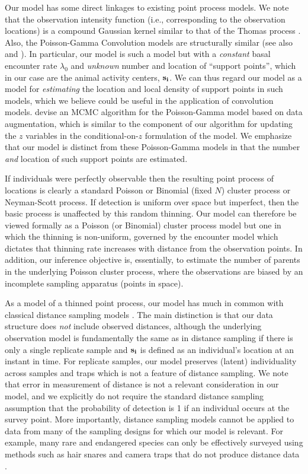 Our model has some direct linkages to existing point process
models. We note that the observation intensity function (i.e.,
corresponding to the observation
locations) is a compound Gaussian kernel similar to
that of the Thomas process
\citep[pp. 61-62]{thomas:1949, moller_waagepetersen:2004}.
Also, the Poisson-Gamma Convolution models
\citep{wolpert_ickstadt:1998} are structurally similar (see also \cite{higdon:1998}
and \cite{best_etal:2000}).
 In particular, our model is such a model but
with a {\it constant} basal encounter rate $\lambda_{0}$
and {\it unknown} number and location of ``support points'', which in
our case are the animal activity centers, $\bf{s_i}$.
We can thus regard our model as a model for
{\it estimating} the location and local density of support points in
such models, which we believe could be useful in the application of
convolution models.  \citet{best_etal:2000} devise an MCMC algorithm for the
Poisson-Gamma model based on data augmentation, which is
similar to the component of our algorithm for
updating the $z$ variables in
the conditional-on-$z$ formulation of the model.  We emphasize that
our model is distinct from these Poisson-Gamma models
in that the number {\it and} location of such
support points are estimated.


If individuals were perfectly observable then the resulting point
process of locations is clearly a standard Poisson or Binomial (fixed
$N$) cluster process or Neyman-Scott process.
If detection is uniform over space but
imperfect, then the basic process is unaffected by this random thinning.
Our model can therefore be viewed formally as a Poisson (or Binomial)
cluster process model but one in which the thinning is
non-uniform, governed by the encounter model which dictates that
thinning rate increases with distance from the observation points. In
addition, our inference objective is, essentially, to estimate the
number of parents in the underlying Poisson cluster
process,
where the observations are biased by an incomplete sampling apparatus
(points in space).


As a model of a thinned point process, our model has much in common
with classical distance sampling models \citep{buckland_etal:2001}.
The main distinction is that our data structure does {\it not} include
observed distances, although the underlying observation model is
fundamentally the same as in distance sampling if there is only a
single replicate sample and $\bf{s}_i$ is defined as an individual's
location at an instant in time. For replicate samples, our model preserves
(latent) individuality across samples and traps which is not a feature
of distance sampling. We note that error in measurement of distance is
not a relevant consideration in our model, and we explicitly do not
require the standard distance sampling assumption that the probability
of detection is 1 if an individual occurs at the survey point. More
importantly, distance sampling models cannot be applied to data from
many of the sampling designs for which our model is relevant. For
example, many rare and endangered species can only be
effectively surveyed using methods such as hair snares and camera
traps that do not produce distance data \citep{oconnell_etal:2010}.


